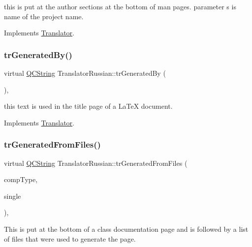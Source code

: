this is put at the author sections at the bottom of man pages. parameter s is name of the project name. 

Implements \mbox{\hyperlink{class_translator}{Translator}}.

\mbox{\label{class_translator_russian_ae6b6c18fe970a6af4f73890b9470561e}} 
\subsubsection{\texorpdfstring{trGeneratedBy()}{trGeneratedBy()}}
{\footnotesize\ttfamily virtual \mbox{\hyperlink{class_q_c_string}{Q\+C\+String}} Translator\+Russian\+::tr\+Generated\+By (\begin{DoxyParamCaption}{ }\end{DoxyParamCaption})\hspace{0.3cm}{\ttfamily [inline]}, {\ttfamily [virtual]}}

this text is used in the title page of a La\+TeX document. 

Implements \mbox{\hyperlink{class_translator}{Translator}}.

\mbox{\label{class_translator_russian_ae8bea5275ce564a676c181850a7281c5}} 
\subsubsection{\texorpdfstring{trGeneratedFromFiles()}{trGeneratedFromFiles()}}
{\footnotesize\ttfamily virtual \mbox{\hyperlink{class_q_c_string}{Q\+C\+String}} Translator\+Russian\+::tr\+Generated\+From\+Files (\begin{DoxyParamCaption}\item[{\mbox{\hyperlink{class_class_def_ae70cf86d35fe954a94c566fbcfc87939}{Class\+Def\+::\+Compound\+Type}}}]{comp\+Type,  }\item[{bool}]{single }\end{DoxyParamCaption})\hspace{0.3cm}{\ttfamily [inline]}, {\ttfamily [virtual]}}

This is put at the bottom of a class documentation page and is followed by a list of files that were used to generate the page. 

